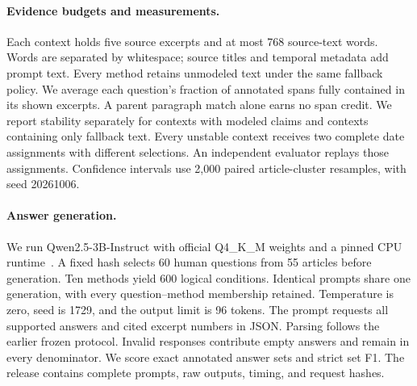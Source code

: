 \paragraph{Evidence budgets and measurements.}
Each context holds five source excerpts and at most 768 source-text words.
Words are separated by whitespace; source titles and temporal metadata add prompt text.
Every method retains unmodeled text under the same fallback policy.
We average each question's fraction of annotated spans fully contained in its shown excerpts.
A parent paragraph match alone earns no span credit.
We report stability separately for contexts with modeled claims and contexts containing only fallback text.
Every unstable context receives two complete date assignments with different selections.
An independent evaluator replays those assignments.
Confidence intervals use 2,000 paired article-cluster resamples, with seed 20261006.

\paragraph{Answer generation.}
We run Qwen2.5-3B-Instruct with official Q4\_K\_M weights and a pinned CPU runtime~\citep{qwen2024model}.
A fixed hash selects 60 human questions from 55 articles before generation.
Ten methods yield 600 logical conditions.
Identical prompts share one generation, with every question--method membership retained.
Temperature is zero, seed is 1729, and the output limit is 96 tokens.
The prompt requests all supported answers and cited excerpt numbers in JSON.
Parsing follows the earlier frozen protocol.
Invalid responses contribute empty answers and remain in every denominator.
We score exact annotated answer sets and strict set F1.
The release contains complete prompts, raw outputs, timing, and request hashes.
